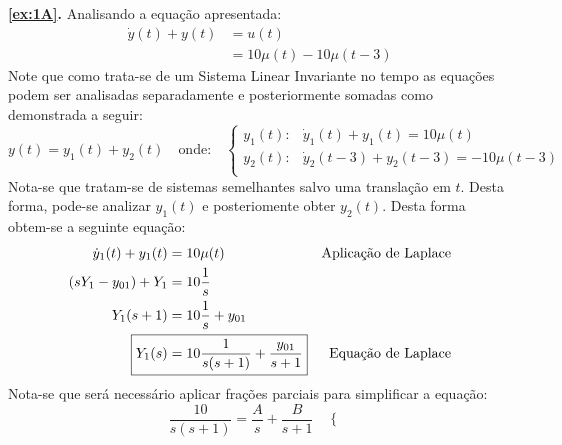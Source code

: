 \documentclass{article}
\begin{document}
\newpage
            \begin{resolution}
                \textbf{\ref{ex:1A}.} Analisando a equação apresentada:
                    \begin{align}
                        \dot{y}(t) + y(t) &= u(t)\label{eq:Definition}\\
                                          &= 10\mu(t) - 10\mu(t-3)\nonumber
                    \end{align}
                Note que como trata-se de um Sistema Linear Invariante no tempo as equações podem ser analisadas separadamente e posteriormente somadas como demonstrada a seguir:
                    \begin{equation}
                        y(t) = y_{1}(t) + y_{2}(t)
                        \quad\text{onde:}\quad
                        \begin{cases}
                            y_{1}(t): & \dot{y}_{1}(t) + y_{1}(t) = 10\mu(t)\\
                            y_{2}(t): & \dot{y}_{2}(t-3) + y_{2}(t-3) =-10\mu(t-3)\\
                        \end{cases}
                        \label{eq:Cases}
                    \end{equation}
                Nota-se que tratam-se de sistemas semelhantes salvo uma translação em $t$. Desta forma, pode-se analizar $y_{1}(t)$ e posteriomente obter $y_{2}(t)$. Desta forma obtem-se a seguinte equação:
                    \begin{align}
                        \dot{y}_{1}(t) + y_{1}(t) &= 10\mu(t) & \text{Aplicação de Laplace}\nonumber\\
                        (sY_{1} - y_{01}) + Y_{1} &= 10\frac{1}{s}\nonumber\\
                        Y_{1}(s + 1)     &= 10\frac{1}{s} + y_{01}\nonumber\\
                        \Aboxed{Y_{1}(s) &= 10\frac{1}{s(s + 1)} + \frac{y_{01}}{s + 1}} & \text{Equação de Laplace}
                    \end{align}
                Nota-se que será necessário aplicar frações parciais para simplificar a equação:
                    \begin{equation*}
                        \frac{10}{s(s + 1)} = 
                            \frac{A}{s} + 
                            \frac{B}{s + 1}
                        \quad
                        \begin{cases}

\end{cases}
\end{equation*}
\end{resolution}
\end{document}
